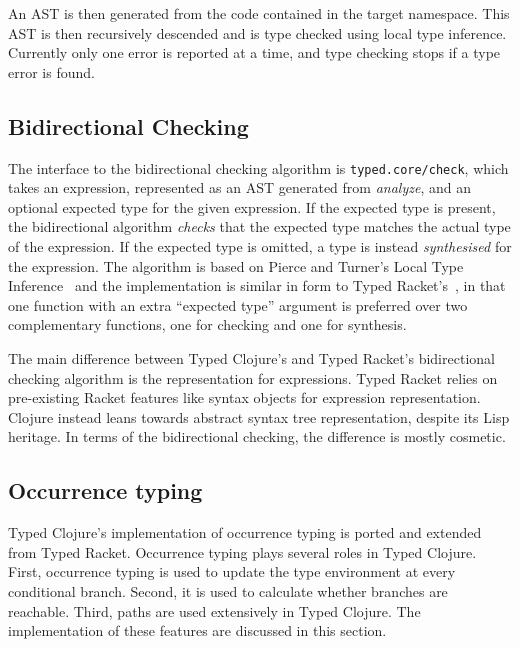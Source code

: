 An AST is then generated from the code contained in the target namespace.
This AST is then recursively descended and is type checked using local type inference.
Currently only one error is reported at a time, and type checking stops if a type error
is found.

\subsection{Bidirectional Checking}

The interface to the bidirectional checking algorithm is \lstinline|typed.core/check|,
which takes an expression, represented as an AST generated from \emph{analyze}, and an optional expected type for
the given expression. If the expected type is present, the bidirectional algorithm \emph{checks}
that the expected type matches the actual type of the expression.
If the expected type is omitted, a type is instead \emph{synthesised} for the expression.
The algorithm is based on Pierce and Turner's  Local Type Inference~\cite{PT00}
and the implementation is similar in form to Typed Racket's~\cite{TF08}, in that
one function with an extra ``expected type'' argument is preferred over two complementary
functions, one for checking and one for synthesis.

The main difference between Typed Clojure's and Typed Racket's bidirectional checking
algorithm is the representation for expressions. Typed Racket relies on pre-existing
Racket features like syntax objects for expression representation. Clojure instead
leans towards abstract syntax tree representation, despite its Lisp heritage.
In terms of the bidirectional checking, the difference is mostly cosmetic.



\subsection{Occurrence typing}
\label{sec:occurenceimpl}

Typed Clojure's implementation of occurrence typing is ported and extended from Typed Racket.
Occurrence typing plays several roles in Typed Clojure.
First, occurrence typing is used to update the type environment at every conditional branch.
Second, it is used to calculate whether branches are reachable.
Third, paths are used extensively in Typed Clojure. 
The implementation of these features are discussed in this section.

